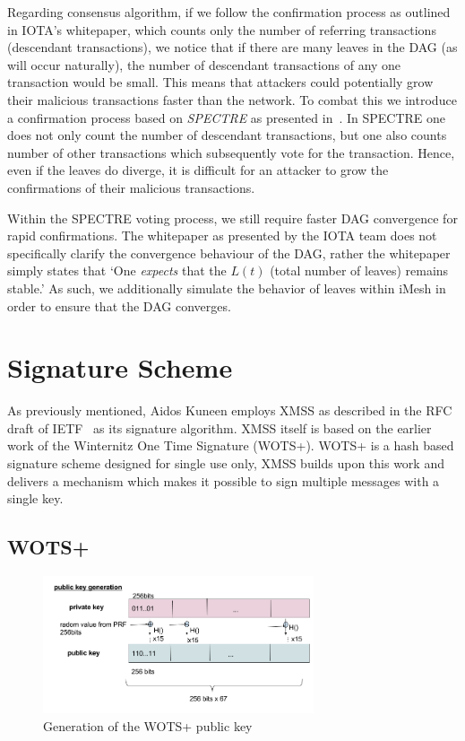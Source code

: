 \documentclass[a4paper,10pt,twocolumn]{article}
\begin{document}
Regarding consensus algorithm, if we follow the confirmation process as outlined in IOTA's whitepaper, which counts only the number of referring transactions 
(descendant transactions), we notice that if there are many leaves in the DAG (as will occur naturally), the number of 
descendant transactions of any one transaction would be small. This means that attackers could potentially grow their malicious 
transactions faster than the network. To combat this we introduce a confirmation process based on \emph{SPECTRE} as presented 
in~\cite{spectre}. In SPECTRE one does not only count the number of descendant transactions, but one also counts number of other 
transactions which subsequently vote for the transaction. Hence, even if the leaves do diverge, it is difficult for an attacker to grow 
the confirmations of their malicious transactions.

Within the SPECTRE voting process, we still require faster DAG convergence for rapid confirmations. The whitepaper as presented by the 
IOTA team does not specifically clarify the convergence behaviour of the DAG, rather the whitepaper simply states that `One 
\emph{expects} that the \( L(t) \) (total number of leaves) remains stable.' As such, we additionally simulate the behavior of leaves 
within iMesh in order to ensure that the DAG converges.

\section{Signature Scheme}
\label{sec:sig}

As previously mentioned, Aidos Kuneen employs XMSS as described in the RFC draft of IETF~\cite{ietf} as its signature algorithm. XMSS 
itself is based on the earlier work of the Winternitz One Time Signature (WOTS+). WOTS+ is a hash based signature scheme designed for 
single use only, XMSS builds upon this work and delivers a mechanism which makes it possible to sign multiple messages with a single 
key.

\subsection{WOTS+}

\begin{figure}[ht]
	\begin{center}
	\includegraphics[width=80mm]{wots_pub.png}
	  \caption{Generation of the WOTS+ public key}
    \label{fig:wots_pub}
	\end{center}
 \end{figure}
\end{document}
